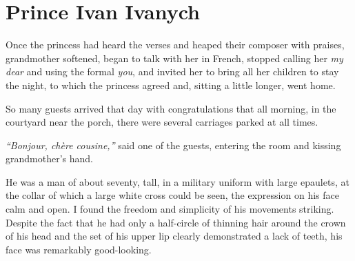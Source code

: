 \chapter{Prince Ivan Ivanych} %

Once the princess had heard the verses and heaped their composer with praises, grandmother softened, began to talk with her in French, stopped calling her \textit{my dear} and using the formal \textit{you}, and invited her to bring all her children to stay the night, to which the princess agreed and, sitting a little longer, went home.

So many guests arrived that day with congratulations that all morning, in the courtyard near the porch, there were several carriages parked at all times.

\textit{``Bonjour, ch\`ere cousine,''} said one of the guests, entering the room and kissing grandmother's hand. %

He was a man of about seventy, tall, in a military uniform with large epaulets, at the collar of which a large white cross could be seen, the expression on his face calm and open. I found the freedom and simplicity of his movements striking. Despite the fact that he had only a half-circle of thinning hair around the crown of his head and the set of his upper lip clearly demonstrated a lack of teeth, his face was remarkably good-looking.

